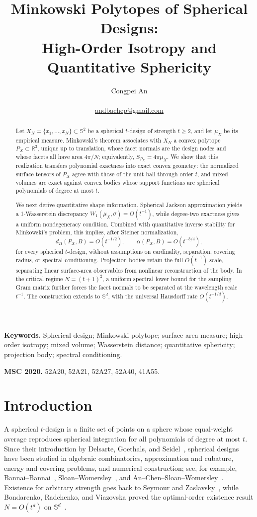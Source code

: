 \documentclass[11pt]{article}
\title{\textbf{Minkowski Polytopes of Spherical Designs:}\\[3pt]
\textbf{High-Order Isotropy and Quantitative Sphericity}}
\author{Congpei An\\[4pt]
\small %
\small \\[2pt]
\small  \href{mailto:andbachcp@gmail.com}{andbachcp@gmail.com}\\
\small }
\date{}
\theoremstyle{definition}
\theoremstyle{remark}
\newcommand{\Sph}{\mathbb S}
\newcommand{\R}{\mathbb R}
\begin{document}
\maketitle

\begin{abstract}
Let $X_N=\{x_1,\dots,x_N\}\subset \Sph^2$ be a spherical $t$-design of strength $t\ge2$, and let $\mu_X$ be its empirical measure. Minkowski's theorem associates with $X_N$ a convex polytope $P_X\subset\R^3$, unique up to translation, whose facet normals are the design nodes and whose facets all have area $4\pi/N$; equivalently, $S_{P_X}=4\pi\mu_X$. We show that this realization transfers polynomial exactness into exact convex geometry: the normalized surface tensors of $P_X$ agree with those of the unit ball through order $t$, and mixed volumes are exact against convex bodies whose support functions are spherical polynomials of degree at most $t$.

We next derive quantitative shape information. Spherical Jackson approximation yields a $1$-Wasserstein discrepancy $W_1(\mu_X,\sigma)=O(t^{-1})$, while degree-two exactness gives a uniform nondegeneracy condition. Combined with quantitative inverse stability for Minkowski's problem, this implies, after Steiner normalization,
\[
d_H(P_X,B)=O(t^{-1/2}),\qquad \alpha(P_X,B)=O(t^{-3/4}),
\]
for every spherical $t$-design, without assumptions on cardinality, separation, covering radius, or spectral conditioning. Projection bodies retain the full $O(t^{-1})$ scale, separating linear surface-area observables from nonlinear reconstruction of the body. In the critical regime $N=(t+1)^2$, a uniform spectral lower bound for the sampling Gram matrix further forces the facet normals to be separated at the wavelength scale $t^{-1}$. The construction extends to $\Sph^d$, with the universal Hausdorff rate $O(t^{-1/d})$.
\end{abstract}

\medskip
\noindent\textbf{Keywords.} Spherical design; Minkowski polytope; surface area measure; high-order isotropy; mixed volume; Wasserstein distance; quantitative sphericity; projection body; spectral conditioning.

\noindent\textbf{MSC 2020.} 52A20, 52A21, 52A27, 52A40, 41A55.

\section{Introduction}

A spherical $t$-design is a finite set of points on a sphere whose equal-weight average reproduces spherical integration for all polynomials of degree at most $t$. Since their introduction by Delsarte, Goethals, and Seidel~\cite{DGS1977}, spherical designs have been studied in algebraic combinatorics, approximation and cubature, energy and covering problems, and numerical construction; see, for example, Bannai--Bannai~\cite{BannaiBannai2009}, Sloan--Womersley~\cite{SloanWomersley2009}, and An--Chen--Sloan--Womersley~\cite{An2010}. Existence for arbitrary strength goes back to Seymour and Zaslavsky~\cite{SeymourZaslavsky1984}, while Bondarenko, Radchenko, and Viazovska proved the optimal-order existence result $N=O(t^d)$ on $\Sph^d$~\cite{BRV2013}.
\end{document}
